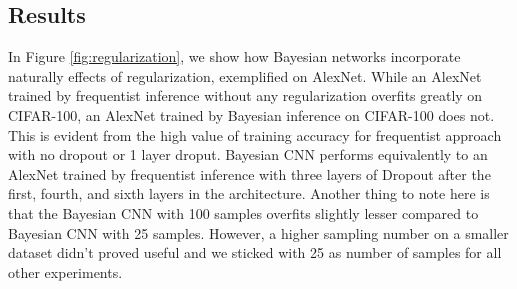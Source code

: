 \subsection{Results}

\begin{table}[H]
\tiny
    \centering
    \renewcommand{\arraystretch}{1.5}
    \renewcommand{\arraystretch}{1.5}
    \caption{Comparison of validation accuracies (in percentage) for different architectures with variational inference (VI), frequentist inference and Dropout as a Bayesian approximation as proposed by Gal and Ghahramani \cite{gal2015bayesian} for MNIST, CIFAR-10, and CIFAR-100.}
    \label{tab:resultsCIFAR-100}
\end{table}

In Figure \ref{fig:regularization}, we show how Bayesian networks incorporate naturally effects of regularization, exemplified on AlexNet. While an AlexNet trained by frequentist inference without any regularization overfits greatly on CIFAR-100, an AlexNet trained by Bayesian inference on CIFAR-100 does not. This is evident from the high value of training accuracy for frequentist approach with no dropout or 1 layer droput. Bayesian CNN performs equivalently to an AlexNet trained by frequentist inference with three layers of Dropout after the first, fourth, and sixth layers in the architecture.
Another thing to note here is that the Bayesian CNN with 100 samples overfits slightly lesser compared to Bayesian CNN with 25 samples. However, a higher sampling number on a smaller dataset didn't proved useful and we sticked with 25 as number of samples for all other experiments.


